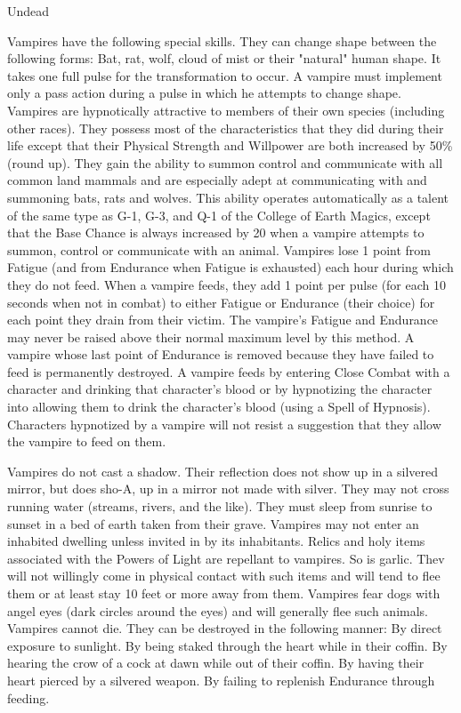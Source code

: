 \begin{mmgroup}{Undead}
\begin{description}
Vampires have the following special skills. They can change shape
between the following forms: Bat, rat, wolf, cloud of mist or their
"natural" human shape. It takes one full pulse for the transformation
to occur. A vampire must implement only a pass action during a pulse
in which he attempts to change shape. Vampires are hypnotically
attractive to members of their own species (including other races).
They possess most of the characteristics that they did during their
life except that their Physical Strength and Willpower are both
increased by 50\% (round up). They gain the ability to summon control
and communicate with all common land mammals and are especially adept
at communicating with and summoning bats, rats and wolves. This
ability operates automatically as a talent of the same type as G-1,
G-3, and Q-1 of the College of Earth Magics, except that the Base
Chance is always increased by 20 when a vampire attempts to summon,
control or communicate with an animal.  Vampires lose 1 point from
Fatigue (and from Endurance when Fatigue is exhausted) each hour
during which they do not feed.  When a vampire feeds, they add 1 point
per pulse (for each 10 seconds when not in combat) to either Fatigue
or Endurance (their choice) for each point they drain from their
victim. The vampire's Fatigue and Endurance may never be raised above
their normal maximum level by this method. A vampire whose last point
of Endurance is removed because they have failed to feed is
permanently destroyed. A vampire feeds by entering Close Combat with a
character and drinking that character's blood or by hypnotizing the
character into allowing them to drink the character's blood (using a
Spell of Hypnosis). Characters hypnotized by a vampire will not resist
a suggestion that they allow the vampire to feed on them.

Vampires do not cast a shadow. Their reflection does not show up in a
silvered mirror, but does sho-A, up in a mirror not made with
silver. They may not cross running water (streams, rivers, and the
like). They must sleep from sunrise to sunset in a bed of earth taken
from their grave. Vampires may not enter an inhabited dwelling unless
invited in by its inhabitants.  Relics and holy items associated with
the Powers of Light are repellant to vampires. So is garlic.  Thev
will not willingly come in physical contact with such items and will
tend to flee them or at least stay 10 feet or more away from them.
Vampires fear dogs with angel eyes (dark circles around the eyes) and
will generally flee such animals.  Vampires cannot die.  They can be
destroyed in the following manner:
 By direct exposure to sunlight.
 By being staked through the heart while in their coffin.
 By hearing the crow of a cock at dawn while out of their coffin.
 By having their heart pierced by a silvered weapon.
 By failing to replenish Endurance through feeding.



\end{description}
\end{mmgroup}
